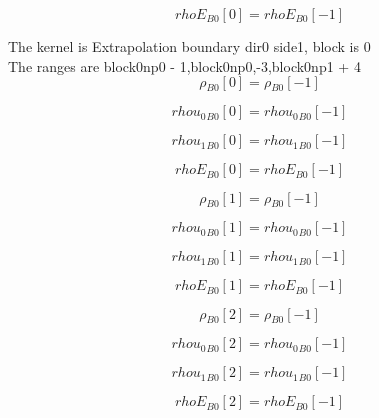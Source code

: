 \documentclass{article}
\begin{document}
\begin{dmath}{rhoE{_{B0}}}[{0}] = {rhoE{_{B0}}}[{-1}]\end{dmath}

\noindent The kernel is Extrapolation boundary dir0 side1, block is 0\\\noindent The ranges are block0np0 - 1,block0np0,-3,block0np1 + 4\\\begin{dmath}{\rho{_{B0}}}[{0}] = {\rho{_{B0}}}[{-1}]\end{dmath}

\begin{dmath}{rhou_{0}{_{B0}}}[{0}] = {rhou_{0}{_{B0}}}[{-1}]\end{dmath}

\begin{dmath}{rhou_{1}{_{B0}}}[{0}] = {rhou_{1}{_{B0}}}[{-1}]\end{dmath}

\begin{dmath}{rhoE{_{B0}}}[{0}] = {rhoE{_{B0}}}[{-1}]\end{dmath}

\begin{dmath}{\rho{_{B0}}}[{1}] = {\rho{_{B0}}}[{-1}]\end{dmath}

\begin{dmath}{rhou_{0}{_{B0}}}[{1}] = {rhou_{0}{_{B0}}}[{-1}]\end{dmath}

\begin{dmath}{rhou_{1}{_{B0}}}[{1}] = {rhou_{1}{_{B0}}}[{-1}]\end{dmath}

\begin{dmath}{rhoE{_{B0}}}[{1}] = {rhoE{_{B0}}}[{-1}]\end{dmath}

\begin{dmath}{\rho{_{B0}}}[{2}] = {\rho{_{B0}}}[{-1}]\end{dmath}

\begin{dmath}{rhou_{0}{_{B0}}}[{2}] = {rhou_{0}{_{B0}}}[{-1}]\end{dmath}

\begin{dmath}{rhou_{1}{_{B0}}}[{2}] = {rhou_{1}{_{B0}}}[{-1}]\end{dmath}

\begin{dmath}{rhoE{_{B0}}}[{2}] = {rhoE{_{B0}}}[{-1}]\end{dmath}
\end{document}

